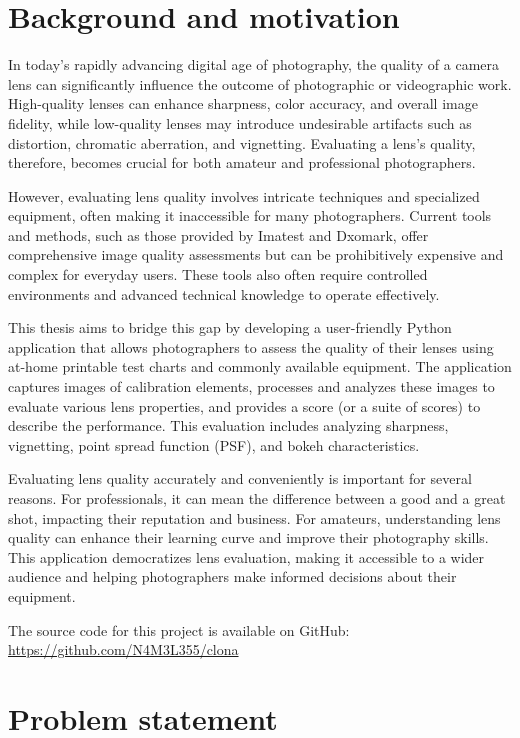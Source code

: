\section*{Background and motivation}
In today's rapidly advancing digital age of photography, the quality of a camera lens can significantly influence the outcome of photographic or videographic work. High-quality lenses can enhance sharpness, color accuracy, and overall image fidelity, while low-quality lenses may introduce undesirable artifacts such as distortion, chromatic aberration, and vignetting. Evaluating a lens's quality, therefore, becomes crucial for both amateur and professional photographers.

However, evaluating lens quality involves intricate techniques and specialized equipment, often making it inaccessible for many photographers. Current tools and methods, such as those provided by Imatest and Dxomark, offer comprehensive image quality assessments but can be prohibitively expensive and complex for everyday users. These tools also often require controlled environments and advanced technical knowledge to operate effectively.

This thesis aims to bridge this gap by developing a user-friendly Python application that allows photographers to assess the quality of their lenses using at-home printable test charts and commonly available equipment. The application captures images of calibration elements, processes and analyzes these images to evaluate various lens properties, and provides a score (or a suite of scores) to describe the performance. This evaluation includes analyzing sharpness, vignetting, point spread function (PSF), and bokeh characteristics.


Evaluating lens quality accurately and conveniently is important for several reasons. For professionals, it can mean the difference between a good and a great shot, impacting their reputation and business. For amateurs, understanding lens quality can enhance their learning curve and improve their photography skills. This application democratizes lens evaluation, making it accessible to a wider audience and helping photographers make informed decisions about their equipment.



The source code for this project is available on GitHub: \url{https://github.com/N4M3L355/clona}
\section*{Problem statement}
